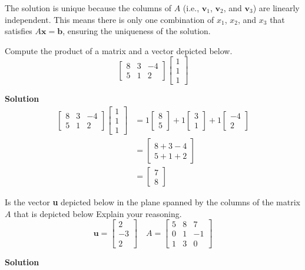 \documentclass[11pt]{scrartcl}
\theoremstyle{dotlessP}
\theoremstyle{dotlessN}
\begin{document}
The solution is unique because the columns of $A$ (i.e., $\textbf{v}_1$, $\textbf{v}_2$, and $\textbf{v}_3$) are linearly independent. This means there is only one combination of $x_1$, $x_2$, and $x_3$ that satisfies $A\textbf{x} = \textbf{b}$, ensuring the uniqueness of the solution.
\begin{ques}
	Compute the product of a matrix and a vector depicted below.
	\[
	\begin{bmatrix}
		8 & 3 & -4 \\
		5 & 1 & 2 
	\end{bmatrix} 
	\begin{bmatrix}
		1 \\
		1 \\
		1
	\end{bmatrix}
	\] 
\end{ques}
\textbf{Solution}
\begin{align*}
	\begin{bmatrix}
		8 & 3 & -4 \\
		5 & 1 & 2 
	\end{bmatrix} 
	\begin{bmatrix}
		1 \\
		1 \\
		1
	\end{bmatrix} &= 
	1 \begin{bmatrix}
		8 \\
		5 
	\end{bmatrix} + 1 
	\begin{bmatrix}
		3 \\
		1
	\end{bmatrix} + 1
	\begin{bmatrix}
		-4 \\
		2
	\end{bmatrix} \\
	&= 
	\begin{bmatrix}
		8 + 3 - 4 \\
		5 + 1 + 2 
	\end{bmatrix} \\
	&= 
	\begin{bmatrix}
		7 \\
		8
	\end{bmatrix}
\end{align*}
\begin{ques}
	Is the vector \textbf{u} depicted below in the plane spanned by the columns of the matrix $A$ that is depicted below Explain your reasoning.
	\[
		\textbf{u} = 
		\begin{bmatrix}
			2 \\
			-3 \\
			2
		\end{bmatrix} \quad
		A = 
		\begin{bmatrix}
			5 & 8 & 7 \\
			0 & 1 & -1 \\
			1 & 3 & 0
		\end{bmatrix}
	\] 
\end{ques}
\textbf{Solution}
\end{document}
